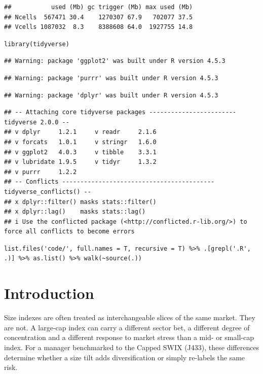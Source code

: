 \documentclass[11pt,preprint]{elsarticle}
\numberwithin{equation}{section}
\numberwithin{figure}{section}
\numberwithin{table}{section}
\begin{document}
\begin{verbatim}
##           used (Mb) gc trigger (Mb) max used (Mb)
## Ncells  567471 30.4    1270307 67.9   702077 37.5
## Vcells 1087032  8.3    8388608 64.0  1927755 14.8
\end{verbatim}

\begin{verbatim}
library(tidyverse)
\end{verbatim}

\begin{verbatim}
## Warning: package 'ggplot2' was built under R version 4.5.3
\end{verbatim}

\begin{verbatim}
## Warning: package 'purrr' was built under R version 4.5.3
\end{verbatim}

\begin{verbatim}
## Warning: package 'dplyr' was built under R version 4.5.3
\end{verbatim}

\begin{verbatim}
## -- Attaching core tidyverse packages ------------------------ tidyverse 2.0.0 --
## v dplyr     1.2.1     v readr     2.1.6
## v forcats   1.0.1     v stringr   1.6.0
## v ggplot2   4.0.3     v tibble    3.3.1
## v lubridate 1.9.5     v tidyr     1.3.2
## v purrr     1.2.2     
## -- Conflicts ------------------------------------------ tidyverse_conflicts() --
## x dplyr::filter() masks stats::filter()
## x dplyr::lag()    masks stats::lag()
## i Use the conflicted package (<http://conflicted.r-lib.org/>) to force all conflicts to become errors
\end{verbatim}

\begin{verbatim}
list.files('code/', full.names = T, recursive = T) %>% .[grepl('.R', .)] %>% as.list() %>% walk(~source(.))
\end{verbatim}

\section{\texorpdfstring{Introduction
\label{Introduction}}{Introduction }}\label{introduction}

Size indexes are often treated as interchangeable slices of the same
market. They are not. A large-cap index can carry a different sector
bet, a different degree of concentration and a different response to
market stress than a mid- or small-cap index. For a manager benchmarked
to the Capped SWIX (J433), these differences determine whether a size
tilt adds diversification or simply re-labels the same risk.
\end{document}
